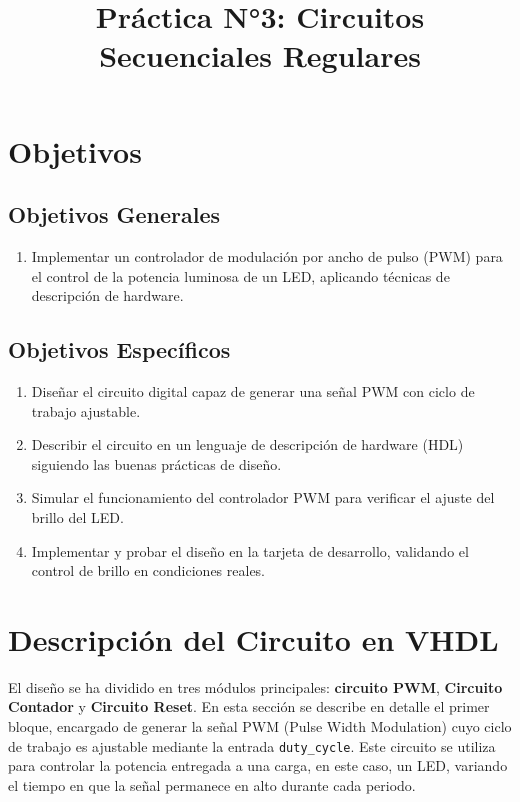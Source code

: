 \documentclass[a4paper,12pt]{article}
\title{Práctica N°3: Circuitos Secuenciales Regulares}
\date{}
\begin{document}
\maketitle
\tableofcontents
\newpage

\section{Objetivos}

\subsection{Objetivos Generales}
\begin{enumerate}
    \item Implementar un controlador de modulación por ancho de pulso (PWM) para el control de la potencia luminosa de un LED, aplicando técnicas de descripción de hardware.
\end{enumerate}

\subsection{Objetivos Específicos}
\begin{enumerate}
    \item Diseñar el circuito digital capaz de generar una señal PWM con ciclo de trabajo ajustable.
    \item Describir el circuito en un lenguaje de descripción de hardware (HDL) siguiendo las buenas prácticas de diseño.
    \item Simular el funcionamiento del controlador PWM para verificar el ajuste del brillo del LED.
    \item Implementar y probar el diseño en la tarjeta de desarrollo, validando el control de brillo en condiciones reales.
\end{enumerate}



\section{Descripción del Circuito en VHDL}

El diseño se ha dividido en tres módulos principales: \textbf{circuito PWM}, \textbf{Circuito Contador} y \textbf{Circuito Reset}.  
En esta sección se describe en detalle el primer bloque, encargado de generar la señal PWM (Pulse Width Modulation) cuyo ciclo de trabajo es ajustable mediante la entrada \texttt{duty\_cycle}. Este circuito se utiliza para controlar la potencia entregada a una carga, en este caso, un LED, variando el tiempo en que la señal permanece en alto durante cada periodo.
\end{document}
